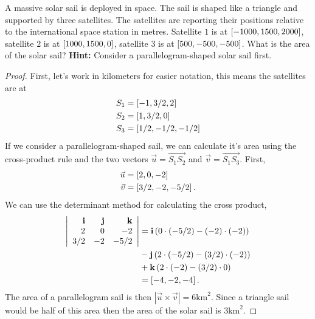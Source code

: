 \documentclass{tutorial}
\begin{document}
\begin{prob} A massive solar sail is deployed in space. The sail is shaped like a triangle and supported by three satellites. The satellites are reporting their positions relative to the international space station in metres. Satellite $1$ is at $\left[ -1000, 1500, 2000\right]$, satellite $2$ is at $\left[ 1000, 1500, 0 \right]$, satellite $3$ is at $\left[ 500, -500, -500 \right]$. What is the area of the solar sail? \textbf{Hint:} Consider a parallelogram-shaped solar sail first.
\end{prob} \ifsolns \begin{proof}
First, let's work in kilometers for easier notation, this means the satellites are at
\begin{align*}
  S_1 & = \left[  -1, 3/2,   2 \right] \\
  S_2 & = \left[   1, 3/2,   0 \right] \\
  S_3 & = \left[ 1/2,-1/2,-1/2 \right]
\end{align*}
If we consider a parallelogram-shaped sail, we can calculate it's area using the cross-product rule and the two vectors $\vec{u} = \overrightarrow{S_1S_2}$ and $\vec{v} = \overrightarrow{S_1S_3}$. First,
\begin{align*}
  \vec{u} & = \left[   2,  0,  -2 \right] \\
  \vec{v} & = \left[ 3/2, -2,-5/2 \right] .
\end{align*}
We can use the determinant method for calculating the cross product,
\begin{align*}
  \left| \begin{array}{rrr}
    \mathbf{i} & \mathbf{j} & \mathbf{k} \\
    2 & 0 & -2 \\
    3/2 & -2 & -5/2
  \end{array} \right|
  & = \mathbf{i} \left( 0 \cdot (-5/2) - (-2) \cdot (-2) \right) \\
  & - \mathbf{j} \left( 2 \cdot (-5/2) - (3/2) \cdot (-2) \right) \\
  & + \mathbf{k} \left( 2 \cdot (-2) - (3/2) \cdot 0 \right) \\
  & = \left[ -4, -2, -4 \right] .
\end{align*}
The area of a parallelogram sail is then $| \vec{u} \times \vec{v} | = 6 \text{km}^2$. Since a triangle sail would be half of this area then the area of the solar sail is $\boxed{3 \text{km}^2}$.
\end{proof}\else \newpage \fi
\end{document}
